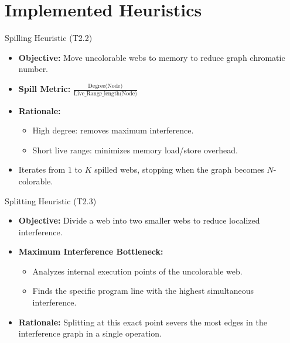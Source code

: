 \documentclass{beamer}
\begin{document}
\section{Implemented Heuristics}
\begin{frame}{Spilling Heuristic (T2.2)}
    \begin{itemize}
        \item \textbf{Objective:} Move uncolorable webs to memory to reduce graph chromatic number.
        \item \textbf{Spill Metric:} $\frac{\text{Degree(Node)}}{\text{Live\_Range\_length(Node)}}$
        \item \textbf{Rationale:} 
        \begin{itemize}
            \item High degree: removes maximum interference.
            \item Short live range: minimizes memory load/store overhead.
        \end{itemize}
        \item Iterates from $1$ to $K$ spilled webs, stopping when the graph becomes $N$-colorable.
    \end{itemize}
\end{frame}

\begin{frame}{Splitting Heuristic (T2.3)}
    \begin{itemize}
        \item \textbf{Objective:} Divide a web into two smaller webs to reduce localized interference.
        \item \textbf{Maximum Interference Bottleneck:}
        \begin{itemize}
            \item Analyzes internal execution points of the uncolorable web.
            \item Finds the specific program line with the highest simultaneous interference.
        \end{itemize}
        \item \textbf{Rationale:} Splitting at this exact point severs the most edges in the interference graph in a single operation.
    \end{itemize}
\end{frame}
\end{document}
